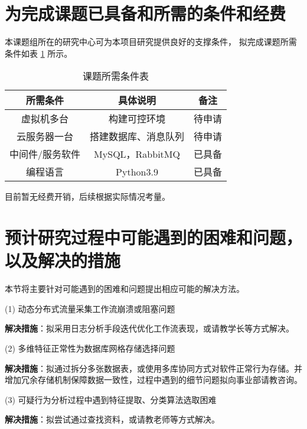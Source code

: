 
\section{为完成课题已具备和所需的条件和经费}
本课题组所在的研究中心可为本项目研究提供良好的支撑条件，
拟完成课题所需条件如表 \ref{table:课题所需条件表} 所示。

\begin{table}[htbp]
	\centering
	\caption{课题所需条件表}\label{table:课题所需条件表}
	\vspace{0.5em}\wuhao
	\begin{tabular}{ccc}
		\toprule
		所需条件        & 具体说明     & 备注    \\
		\midrule
		虚拟机多台          & 构建可控环境           & 待申请      \\
		云服务器一台          & 搭建数据库、消息队列  & 待申请  \\
		中间件/服务软件         & MySQL，RabbitMQ   & 已具备 \\
		编程语言         & Python3.9  & 已具备 \\
	


		\bottomrule
	\end{tabular}
\end{table}

目前暂无经费开销，后续根据实际情况考量。

\section{预计研究过程中可能遇到的困难和问题，以及解决的措施}
本节将主要针对可能遇到的困难和问题提出相应可能的解决方法。

(1) 动态分布式流量采集工作流崩溃或阻塞问题

\textbf{解决措施}：拟采用日志分析手段迭代优化工作流表现，或请教学长等方式解决。 

(2) 多维特征正常性为数据库网格存储选择问题

\textbf{解决措施}：拟通过拆分多张数据表，或使用多库协同方式对软件正常行为存储。并增加冗余存储机制保障数据一致性，过程中遇到的细节问题拟向事业部请教咨询。

(3) 可疑行为分析过程中遇到特征提取、分类算法选取困难

\textbf{解决措施}：拟尝试通过查找资料，或请教老师等方式解决。



